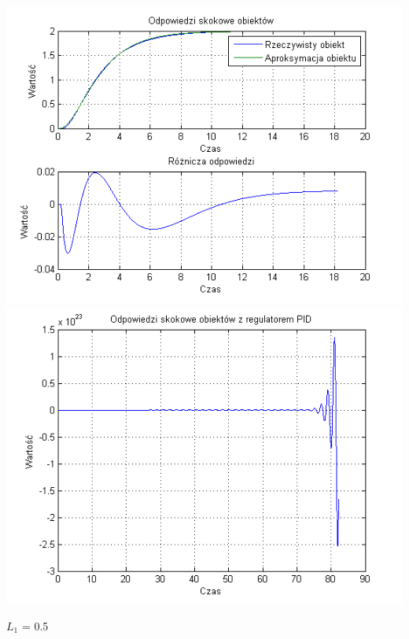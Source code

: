 \documentclass[10pt,a4paper]{article}
\begin{document}
\begin{center}
\includegraphics[scale=1]{images/dwa/skrypt_179.png}\\
\includegraphics[scale=1]{images/dwa/skrypt_180.png}\\
\end{center}
\newpage
$L_1$ = 0.5
\end{document}
